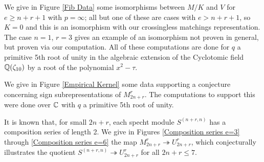 \documentclass{amsart}
\begin{document}
We give in Figure \ref{Fib Data} some isomorphisms between $M/K$ and $V$ for $e \geq n + r + 1$ with $p = \infty$;
all but one of these are cases with $e > n + r + 1$, so $K=0$ and this is an isomorphism with our crossingless matchings representation.
The case $n = 1$, $r = 3$ gives an example of an isomorphism not proven in general, but proven via our computation.
All of these computations are done for $q$ a primitive 5th root of unity in the algebraic extension of the Cyclotomic field $\mathbb{Q}(\zeta_{10})$ by a root of the polynomial $x^2 - \tau$.

We give in Figure \ref{Empirical Kernel} some data supporting a conjecture concerning sign subrepresentations of $M_{2n + r}^r$.
The computations to support this were done over $\mathbb{C}$ with $q$ a primitive 5th root of unity.

It is known that, for small $2n + r$, each specht module $S^{(n+r,n)}$ has a composition series of length 2.
We give in Figures \ref{Composition series e=3} through \ref{Composition series e=6} the map $M_{2n + r}^r \twoheadrightarrow U_{2n + r}^r$, which conjecturally illustrates the quotient $S^{(n+r,n)} \twoheadrightarrow U_{2n + r}^r$ for all $2n + r \leq 7$.
\end{document}
